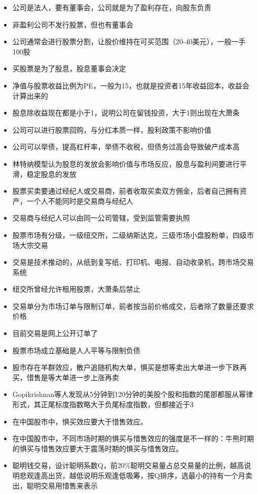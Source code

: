 \documentclass[
]{book}
\providecommand{\tightlist}{%
  \setlength{\itemsep}{0pt}\setlength{\parskip}{0pt}}
\begin{document}
\begin{itemize}
\tightlist
\item
  公司是法人，要有董事会，公司就是为了盈利存在，向股东负责
\item
  非盈利公司不发行股票，但也有董事会
\item
  公司通常会进行股票分割，让股价维持在可买范围（20-40美元），一般一手100股
\item
  买股票是为了股息，股息董事会决定
\item
  净值与股票收益比例为PE，一般为15，也就是投资者15年收益回本，收益会计算出来的
\item
  股息除收益现在都是小于1，说明公司在留钱投资，大于1则出现在大萧条
\item
  公司可以进行股票回购，与分红本质一样，股利政策不影响价值
\item
  公司可以举债，提高杠杆率，举债不收税，但债务过高会导致破产成本高
\item
  林特纳模型认为股息的发放会影响价值与市场反应，股息与盈利间要进行平滑，稳定股息的发放
\item
  股票买卖要通过经纪人或交易商，前者收取买卖双方佣金，后者自己拥有资产，一个人不能同时是交易商与经纪人
\item
  交易商与经纪人可以由同一公司管辖，受到监管需要执照
\item
  股票市场有分级，一级纽交所，二级纳斯达克，三级市场小盘股粉单，四级市场大宗交易
\item
  交易是技术推动的，从纸到复写纸、打印机、电报、自动收录机，跨市场交易系统
\item
  纽交所曾经允许租用股票，大萧条后禁止
\item
  交易单分为市场订单与限制订单，前者按当前价格成交，后者除了数量还要求价格
\item
  目前交易是网上公开订单了
\item
  股票市场成立基础是人人平等与限制负债
\item
  股市存在羊群效应，散户追随机构大单，惧买是想等卖出大单进一步下跌再买，惜售是等大单进一步上涨再卖
\item
  Gopikrishnan等人发现从5分钟到120分钟的美股个股和指数的尾部都服从幂律形式，其正尾标度指数略大于负尾标度指数，但都接近于3
\item
  在中国股市中，惧买效应要大于惜售效应。
\item
  在中国股市中，不同市场时期的惧买与惜售效应的强度是不一样的：牛熊时期的惧买与惜售效应要大于震荡时期的惧买与惜售效应。
\item
  聪明钱交易，设计聪明系数Q，前20\%聪明交易量占总交易量的比例，越高说明悲观逢高出货，越低说明乐观逢低吸筹，按Q排序，选最小的持有一个月卖出，聪明交易用惜售来表示
\end{itemize}
\end{document}
